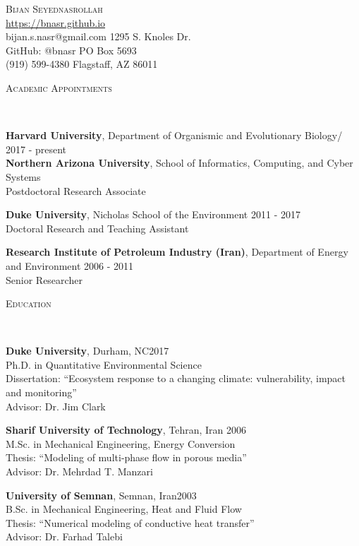 \documentclass[10pt]{article}
\makeatletter
\newenvironment{changemargin}[2]{%
  \begin{list}{}{%
    \setlength{\topsep}{0pt}%
    \setlength{\leftmargin}{#1}%
    \setlength{\rightmargin}{#2}%
    \setlength{\listparindent}{\parindent}%
    \setlength{\itemindent}{\parindent}%
    \setlength{\parsep}{\parskip}%
  }%
  \item[]}{\end{list}
}
\newcommand{\lineover}{
	\begin{changemargin}{-0.05in}{-0.05in}
		\vspace*{-8pt}
		\hrulefill \\
		\vspace*{-2pt}
	\end{changemargin}
}
\newcommand{\header}[1]{
	\begin{changemargin}{-0.5in}{-0.5in}
		\scshape{#1}\\
  	\lineover
	\end{changemargin}
}
\newcommand{\contact}[9]{
	\begin{changemargin}{-0.5in}{-0.5in}
		\begin{flushleft}
			{\huge   \scshape {#1}}\\ \medskip \smallskip
			\url{#2} \hfill{#3}\\
			{#4} \hfill{#5}\\
			GitHub: @{#6} \hfill{#7}\\
			{#8} \hfill{#9}\\
		\end{flushleft}
		\medskip
	\end{changemargin}
}
\newenvironment{body} {
	\vspace*{-2pt}
	\begin{changemargin}{-0.5in}{-0.5in}
  }
	{\end{changemargin}
}
\makeatother
\begin{document}
\contact{Bijan Seyednasrollah}
{https://bnasr.github.io}{}
{bijan.s.nasr@gmail.com}{1295 S. Knoles Dr.}
{bnasr}{PO Box 5693}
{(919) 599-4380}{Flagstaff, AZ 86011}



\medskip
\medskip

\header{Academic Appointments}

\begin{body}

  \textbf{Harvard University}, Department of Organismic and Evolutionary Biology/  \hfill {2017 - present}\\
  \textbf{Northern Arizona University}, School of Informatics, Computing, and Cyber Systems\\
  Postdoctoral Research Associate
\medskip

  \textbf{Duke University}, Nicholas School of the Environment \hfill {2011 - 2017}\\
  Doctoral Research and Teaching Assistant
\medskip

  \textbf{Research Institute of Petroleum Industry (Iran)}, Department of Energy and Environment \hfill {2006 - 2011}\\
  Senior Researcher
\medskip

\end{body}
\medskip

\header{Education}

\begin{body}
	\textbf{Duke University}, Durham, NC\hfill {2017} \\
	{Ph.D. in Quantitative Environmental Science}\\
	Dissertation: ``Ecosystem response to a changing climate: vulnerability, impact and monitoring''\\
	Advisor: Dr. Jim Clark\\
  \medskip

	\textbf{Sharif University of Technology}, Tehran, Iran \hfill {2006} \\
	M.Sc. in Mechanical Engineering, Energy Conversion\\
	Thesis: ``Modeling of multi-phase flow in porous media''\\
	Advisor: Dr. Mehrdad T. Manzari\\
  \medskip

	\textbf{University of Semnan}, Semnan, Iran\hfill {2003} \\
	{B.Sc. in Mechanical Engineering, Heat and Fluid Flow} \\
	Thesis: ``Numerical modeling of conductive heat transfer''\\
	Advisor: Dr. Farhad Talebi\\
	\medskip

\end{body}
\end{document}
